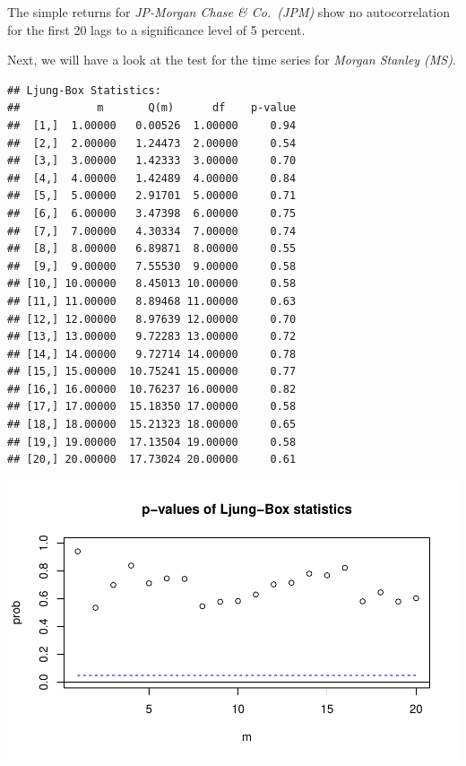 \documentclass[12pt,a4paper]{article}
\newenvironment{Shaded}{\begin{snugshade}}{\end{snugshade}}
\newcommand{\DataTypeTok}[1]{\textcolor[rgb]{0.13,0.29,0.53}{#1}}
\newcommand{\DecValTok}[1]{\textcolor[rgb]{0.00,0.00,0.81}{#1}}
\newcommand{\KeywordTok}[1]{\textcolor[rgb]{0.13,0.29,0.53}{\textbf{#1}}}
\newcommand{\NormalTok}[1]{#1}
\newcommand{\OperatorTok}[1]{\textcolor[rgb]{0.81,0.36,0.00}{\textbf{#1}}}
\begin{document}
\FloatBarrier

The simple returns for \emph{JP-Morgan Chase \& Co.~(JPM)} show no
autocorrelation for the first 20 lags to a significance level of 5
percent.

Next, we will have a look at the test for the time series for
\emph{Morgan Stanley (MS)}. \FloatBarrier

\begin{Shaded}
\end{Shaded}

\begin{verbatim}
## Ljung-Box Statistics:  
##            m       Q(m)      df    p-value
##  [1,]  1.00000   0.00526  1.00000     0.94
##  [2,]  2.00000   1.24473  2.00000     0.54
##  [3,]  3.00000   1.42333  3.00000     0.70
##  [4,]  4.00000   1.42489  4.00000     0.84
##  [5,]  5.00000   2.91701  5.00000     0.71
##  [6,]  6.00000   3.47398  6.00000     0.75
##  [7,]  7.00000   4.30334  7.00000     0.74
##  [8,]  8.00000   6.89871  8.00000     0.55
##  [9,]  9.00000   7.55530  9.00000     0.58
## [10,] 10.00000   8.45013 10.00000     0.58
## [11,] 11.00000   8.89468 11.00000     0.63
## [12,] 12.00000   8.97639 12.00000     0.70
## [13,] 13.00000   9.72283 13.00000     0.72
## [14,] 14.00000   9.72714 14.00000     0.78
## [15,] 15.00000  10.75241 15.00000     0.77
## [16,] 16.00000  10.76237 16.00000     0.82
## [17,] 17.00000  15.18350 17.00000     0.58
## [18,] 18.00000  15.21323 18.00000     0.65
## [19,] 19.00000  17.13504 19.00000     0.58
## [20,] 20.00000  17.73024 20.00000     0.61
\end{verbatim}

\includegraphics{exercise_1_files/figure-latex/unnamed-chunk-4-1.pdf}
\end{document}
